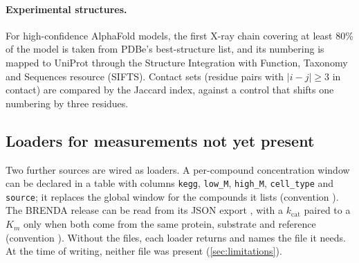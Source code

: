 \paragraph{Experimental structures.}
For high-confidence AlphaFold models, the first X-ray chain covering at least 80\% of the model is taken from PDBe's best-structure list, and its numbering is mapped to UniProt through the Structure Integration with Function, Taxonomy and Sequences resource (SIFTS).
Contact sets (residue pairs with $|i-j|\ge3$ in contact) are compared by the Jaccard index, against a control that shifts one numbering by three residues.

\subsection{Loaders for measurements not yet present}
\label{sec:loaders}

Two further sources are wired as loaders.
A per-compound concentration window can be declared in a table with columns \texttt{kegg}, \texttt{low\_M}, \texttt{high\_M}, \texttt{cell\_type} and \texttt{source}; it replaces the global window for the compounds it lists (convention ).
The BRENDA release can be read from its JSON export \citep{chang2021brenda}, with a $k_{\mathrm{cat}}$ paired to a $K_m$ only when both come from the same protein, substrate and reference (convention ).
Without the files, each loader returns  and names the file it needs.
At the time of writing, neither file was present (\cref{sec:limitations}).
